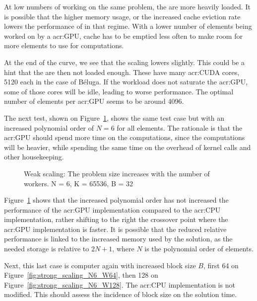 At low numbers of  working on the same problem, the  are
more heavily loaded. It is possible that the higher memory usage, or the increased cache eviction
rate lowers the performance of  in that regime. With a lower number of elements
being worked on by a \acrshort{acr:GPU}, cache has to be emptied less often to make room for more
elements to use for computations.

At the end of the curve, we see that the scaling lowers slightly. This could be a hint that the
 are then not loaded enough. These  have many
\acrshort{acr:CUDA} cores, 5120 each in the case of Béluga. If the workload does not saturate
the \acrshort{acr:GPU}, some of those cores will be idle, leading to worse performance. The optimal
number of elements per \acrshort{acr:GPU} seems to be around 4096.

The next test, shown on Figure~\ref{fig:strong_scaling_N6_W32}, shows the same test case but with an
increased polynomial order of \(N = 6\) for all elements. The rationale is that the
\acrshort{acr:GPU} should spend more time on the computations, since the computations will be
heavier, while spending the same time on the overhead of kernel calls and other housekeeping.

\begin{figure}[H]
	\centering
	
	\caption{Weak scaling: The problem size increases with the number of workers. N = 6, K = 65536, B = 32}\label{fig:strong_scaling_N6_W32}
\end{figure}

Figure~\ref{fig:strong_scaling_N6_W32} shows that the increased polynomial order has not increased
the performance of the \acrshort{acr:GPU} implementation compared to the \acrshort{acr:CPU}
implementation, rather shifting to the right the crossover point where the \acrshort{acr:GPU}
implementation is faster. It is possible that the reduced relative performance is linked to the
increased memory used by the solution, as the needed storage is relative to \(2 N + 1\), where \(N\)
is the polynomial order of elements.

Next, this last case is computer again with increased block size \(B\), first 64 on
Figure~\ref{fig:strong_scaling_N6_W64}, then 128 on Figure~\ref{fig:strong_scaling_N6_W128}. The
\acrshort{acr:CPU} implementation is not modified. This should assess the incidence of block size on
the solution time.

